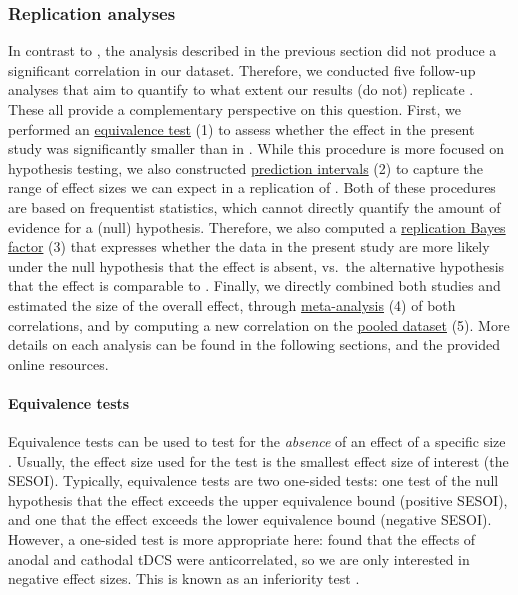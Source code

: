 \documentclass[11pt,english,]{memoir}
\let\oldparagraph\paragraph
\renewcommand{\paragraph}[1]{\oldparagraph{#1}\mbox{}}
\begin{document}
\hypertarget{AB_tDCS-rep-analyses}{%
\subsubsection{Replication analyses}\label{AB_tDCS-rep-analyses}}

In contrast to \textcite{London2015}, the analysis described in the previous section did not produce a significant correlation in our dataset. Therefore, we conducted five follow-up analyses that aim to quantify to what extent our results (do not) replicate \textcite{London2015}. These all provide a complementary perspective on this question. First, we performed an \protect\hyperlink{eq}{equivalence test} (1) to assess whether the effect in the present study was significantly smaller than in \textcite{London2015}. While this procedure is more focused on hypothesis testing, we also constructed \protect\hyperlink{pi}{prediction intervals} (2) to capture the range of effect sizes we can expect in a replication of \textcite{London2015}. Both of these procedures are based on frequentist statistics, which cannot directly quantify the amount of evidence for a (null) hypothesis. Therefore, we also computed a \protect\hyperlink{repBF}{replication Bayes factor} (3) that expresses whether the data in the present study are more likely under the null hypothesis that the effect is absent, vs.~the alternative hypothesis that the effect is comparable to \textcite{London2015}. Finally, we directly combined both studies and estimated the size of the overall effect, through \protect\hyperlink{meta}{meta-analysis} (4) of both correlations, and by computing a new correlation on the \protect\hyperlink{pool}{pooled dataset} (5). More details on each analysis can be found in the following sections, and the provided online resources.

\hypertarget{eq}{%
\paragraph{Equivalence tests}\label{eq}}

Equivalence tests can be used to test for the \emph{absence} of an effect of a specific size \autocite[see][ for a tutorial]{Lakens2018}. Usually, the effect size used for the test is the smallest effect size of interest (the SESOI). Typically, equivalence tests are two one-sided tests: one test of the null hypothesis that the effect exceeds the upper equivalence bound (positive SESOI), and one that the effect exceeds the lower equivalence bound (negative SESOI). However, a one-sided test is more appropriate here: \textcite{London2015} found that the effects of anodal and cathodal tDCS were anticorrelated, so we are only interested in negative effect sizes. This is known as an inferiority test \autocite{Lakens2018}.
\end{document}
